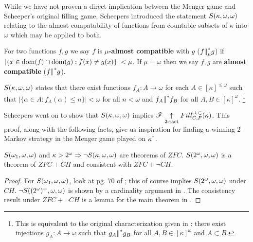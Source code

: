 While we have not proven a direct implication between the Menger game and
Scheeper's original filling game, Scheepers introduced the statement
$S(\kappa,\omega,\omega)$ relating to the almost-compatability of functions
from countable subsets of $\kappa$ into $\omega$ which may be applied to
both.

\begin{defn}
  For two functions $f,g$ we say $f$ is \textbf{$\mu$-almost compatible} with
  $g$ ($f{\parallel}^*_\mu g$) if $|\{x\in\textrm{dom}(f)\cap\textrm{dom}(g):f(x)\not=g(x)\}|<\mu$.
  If $\mu=\omega$ then we say $f,g$ are \textbf{almost compatible}
  ($f{\parallel}^* g$).
\end{defn}

\begin{defn}
  $S(\kappa,\omega,\omega)$ states that there exist functions
  $f_A:A\to\omega$ for each $A\in[\kappa]^{\leq\omega}$ such that
  $|\{\alpha\in A:f_A(\alpha)\leq n\}|<\omega$ for all $n<\omega$ and
  $f_A{\parallel}^* f_B$ for all $A,B\in[\kappa]^\omega$.
  \footnote{
  This is equivalent to the original characterization given in
  \cite{MR1129143}: there exist injections $g_A:A\to\omega$
  such that $g_A{\parallel}^* g_B$ for all $A,B\in[\kappa]^\omega$ and $A\subset B$.
  }
\end{defn}

Scheepers went on to show that $S(\kappa,\omega,\omega)$ implies
$\mathscr{F} \underset{2\text{-tact}}{\uparrow} Fill^{\cup,\subset}_{C,F}(\kappa)$. This proof, along with the following
facts, give us inspiration for
finding a winning $2$-Markov strategy in the Menger game played on
$\kappa^\dagger$.

\begin{thm}
  $S(\omega_1,\omega,\omega)$ and $\kappa>2^\omega\Rightarrow\neg S(\kappa,\omega,\omega)$
  are theorems of $ZFC$.
  $S(2^\omega,\omega,\omega)$ is a theorem of $ZFC+CH$ and consistent with
  $ZFC+\neg CH$.
\end{thm}

\begin{proof}
  For $S(\omega_1,\omega,\omega)$, look at pg. 70 of \cite{MR597342}; this of course
  implies $S(2^\omega,\omega,\omega)$ under $CH$.
  $\neg S((2^\omega)^+,\omega,\omega)$ is shown by a cardinality argument
  in \cite{MR1129143}.
  The consistency result under $ZFC+\neg CH$
  is a lemma for the main theorem in \cite{MR1129143}.
\end{proof}

